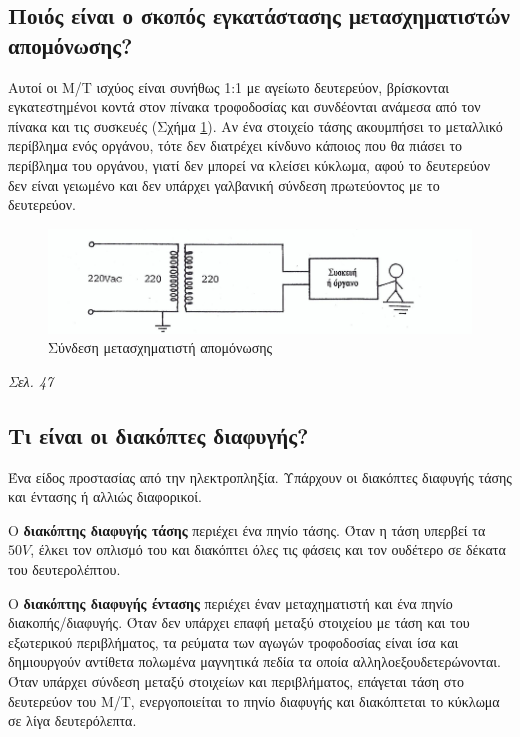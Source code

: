 \documentclass{article}
\begin{document}
\subsection{Ποιός είναι ο σκοπός εγκατάστασης μετασχηματιστών απομόνωσης?}
Αυτοί οι Μ/Τ ισχύος είναι συνήθως 1:1 με αγείωτο δευτερεύον, βρίσκονται εγκατεστημένοι κοντά στον πίνακα τροφοδοσίας και συνδέονται ανάμεσα από τον πίνακα και τις 
συσκευές (Σχήμα \ref{metasximatistisapomonwsis}). Αν ένα στοιχείο τάσης ακουμπήσει το μεταλλικό περίβλημα ενός οργάνου, τότε δεν διατρέχει κίνδυνο κάποιος που θα 
πιάσει το περίβλημα του οργάνου, γιατί δεν μπορεί να κλείσει κύκλωμα, αφού το δευτερεύον δεν είναι γειωμένο και δεν υπάρχει γαλβανική σύνδεση πρωτεύοντος με το 
δευτερεύον.  

\begin{figure}[h!]
    \includegraphics[width=\linewidth]{metasximatistisapomonwsis.png}
    \caption{Σύνδεση μετασχηματιστή απομόνωσης}
    \label{metasximatistisapomonwsis}
\end{figure}

\emph{Σελ. 47}

\subsection{Τι είναι οι διακόπτες διαφυγής?}
Ένα είδος προστασίας από την ηλεκτροπληξία. Υπάρχουν οι διακόπτες διαφυγής τάσης και έντασης ή αλλιώς διαφορικοί. 

O \textbf{διακόπτης διαφυγής τάσης} περιέχει ένα πηνίο τάσης. Όταν η τάση υπερβεί τα $50V$, έλκει τον οπλισμό του και διακόπτει όλες τις φάσεις και τον ουδέτερο σε
δέκατα του δευτερολέπτου.

O \textbf{διακόπτης διαφυγής έντασης} περιέχει έναν μεταχηματιστή και ένα πηνίο διακοπής/διαφυγής. Όταν δεν υπάρχει επαφή μεταξύ στοιχείου με τάση και του εξωτερικού
περιβλήματος, τα ρεύματα των αγωγών τροφοδοσίας είναι ίσα και δημιουργούν αντίθετα πολωμένα  μαγνητικά πεδία τα οποία αλληλοεξουδετερώνονται. Όταν υπάρχει σύνδεση μεταξύ 
στοιχείων και περιβλήματος, επάγεται τάση στο δευτερεύον του M/T, ενεργοποιείται το πηνίο διαφυγής και διακόπτεται το κύκλωμα σε λίγα δευτερόλεπτα.
\end{document}
